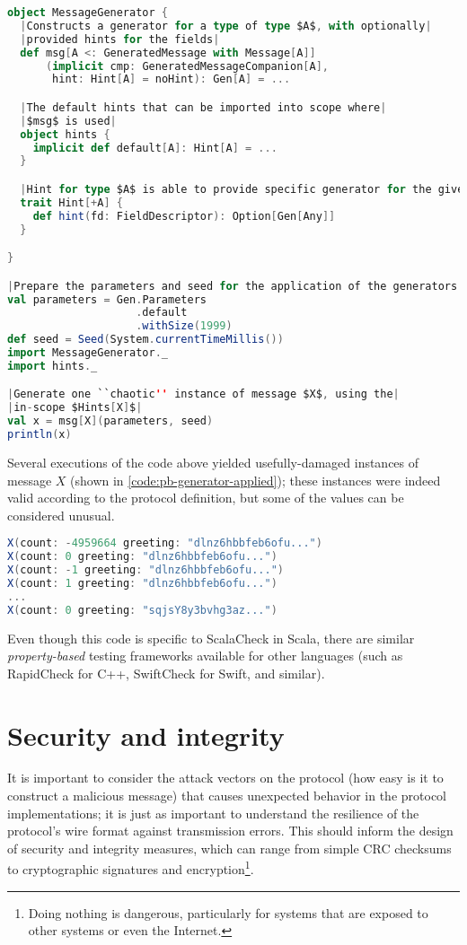 \begin{lstlisting}[caption={Generator}, label={code:pb-generator}, language=Scala, escapechar=|]
object MessageGenerator {
  |Constructs a generator for a type of type $A$, with optionally|
  |provided hints for the fields|
  def msg[A <: GeneratedMessage with Message[A]]
      (implicit cmp: GeneratedMessageCompanion[A], 
       hint: Hint[A] = noHint): Gen[A] = ...

  |The default hints that can be imported into scope where|
  |$msg$ is used|
  object hints {
    implicit def default[A]: Hint[A] = ...
  }

  |Hint for type $A$ is able to provide specific generator for the given $fd$|
  trait Hint[+A] {
    def hint(fd: FieldDescriptor): Option[Gen[Any]]
  }

}

|Prepare the parameters and seed for the application of the generators|
val parameters = Gen.Parameters
                    .default
                    .withSize(1999)
def seed = Seed(System.currentTimeMillis())
import MessageGenerator._
import hints._

|Generate one ``chaotic'' instance of message $X$, using the|
|in-scope $Hints[X]$|
val x = msg[X](parameters, seed)
println(x)
\end{lstlisting}

Several executions of the code above yielded usefully-damaged instances of message $X$ (shown in \autoref{code:pb-generator-applied}); these instances were indeed valid according to the protocol definition, but some of the values can be considered unusual. 

\begin{lstlisting}[caption={Generator examples}, label={code:pb-generator-applied}, language=Scala, escapechar=|]
X(count: -4959664 greeting: "dlnz6hbbfeb6ofu...")
X(count: 0 greeting: "dlnz6hbbfeb6ofu...")
X(count: -1 greeting: "dlnz6hbbfeb6ofu...")
X(count: 1 greeting: "dlnz6hbbfeb6ofu...")
...
X(count: 0 greeting: "sqjsY8y3bvhg3az...")
\end{lstlisting}

Even though this code is specific to ScalaCheck\cite{scalacheck} in Scala, there are similar \emph{property-based} testing frameworks available for other languages (such as RapidCheck\cite{rapidcheck} for C++, SwiftCheck\cite{swiftcheck} for Swift, and similar). 

\section{Security and integrity}
It is important to consider the attack vectors on the protocol (how easy is it to construct a malicious message) that causes unexpected behavior in the protocol implementations; it is just as important to understand the resilience of the protocol's wire format against transmission errors. This should inform the design of security and integrity measures, which can range from simple CRC checksums to cryptographic signatures and encryption\footnote{Doing nothing is dangerous, particularly for systems that are exposed to other systems or even the Internet.}. 

